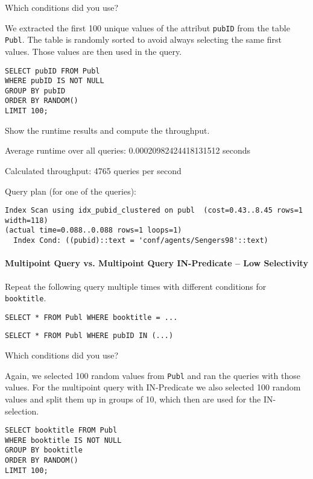 \documentclass[11pt]{scrartcl}
\begin{document}
Which conditions did you use?

We extracted the first 100 unique values of the attribut \texttt{pubID} from the table \texttt{Publ}. The table is randomly sorted to avoid always selecting the same first values. Those values are then used in the query.

\begin{lstlisting}[style=dbtsql]
SELECT pubID FROM Publ
WHERE pubID IS NOT NULL 
GROUP BY pubID
ORDER BY RANDOM() 
LIMIT 100;
\end{lstlisting}

Show the runtime results and compute the throughput.

Average runtime over all queries: 0.00020982424418131512 seconds

Calculated throughput: 4765 queries per second

Query plan (for one of the queries):

{\small
\parskip0pt\begin{verbatim}
Index Scan using idx_pubid_clustered on publ  (cost=0.43..8.45 rows=1 width=118) 
(actual time=0.088..0.088 rows=1 loops=1)
  Index Cond: ((pubid)::text = 'conf/agents/Sengers98'::text)
\end{verbatim}}

\paragraph{Multipoint Query vs. Multipoint Query IN-Predicate -- Low Selectivity}

Repeat the following query multiple times with different conditions for \texttt{booktitle}.

\begin{lstlisting}[style=dbtsql]
SELECT * FROM Publ WHERE booktitle = ...
\end{lstlisting}

\begin{lstlisting}[style=dbtsql]
SELECT * FROM Publ WHERE pubID IN (...)
\end{lstlisting}

Which conditions did you use?

Again, we selected 100 random values from \texttt{Publ} and ran the queries with those values. For the multipoint query with IN-Predicate we also selected 100 random values and split them up in groups of 10, which then are used for the IN-selection.

\begin{lstlisting}[style=dbtsql]
SELECT booktitle FROM Publ
WHERE booktitle IS NOT NULL 
GROUP BY booktitle
ORDER BY RANDOM() 
LIMIT 100;
\end{lstlisting}
\end{document}
